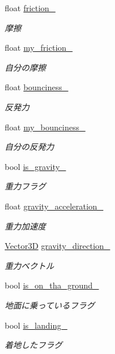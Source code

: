 \begin{DoxyCompactItemize}
float \mbox{\hyperlink{class_physics_a63b2e282267a28f0a160b98d56fa40b6}{friction\+\_\+}}
\begin{DoxyCompactList}\small\item\em 摩擦 \end{DoxyCompactList}\item 
float \mbox{\hyperlink{class_physics_a25f0db16668c86e90babbf9233b57511}{my\+\_\+friction\+\_\+}}
\begin{DoxyCompactList}\small\item\em 自分の摩擦 \end{DoxyCompactList}\item 
float \mbox{\hyperlink{class_physics_a302b8ad7552303570fa1cfd070bb8588}{bounciness\+\_\+}}
\begin{DoxyCompactList}\small\item\em 反発力 \end{DoxyCompactList}\item 
float \mbox{\hyperlink{class_physics_a6a04fea3f4790f2dfc2301940b8ccb6b}{my\+\_\+bounciness\+\_\+}}
\begin{DoxyCompactList}\small\item\em 自分の反発力 \end{DoxyCompactList}\item 
bool \mbox{\hyperlink{class_physics_ab49b5561a800bec8abcb3d35b1125c4e}{is\+\_\+gravity\+\_\+}}
\begin{DoxyCompactList}\small\item\em 重力フラグ \end{DoxyCompactList}\item 
float \mbox{\hyperlink{class_physics_af292ed854ca107f1a09a79931b10c3fa}{gravity\+\_\+acceleration\+\_\+}}
\begin{DoxyCompactList}\small\item\em 重力加速度 \end{DoxyCompactList}\item 
\mbox{\hyperlink{class_vector3_d}{Vector3D}} \mbox{\hyperlink{class_physics_aadfeac1807906f025d97143ba1c0f323}{gravity\+\_\+direction\+\_\+}}
\begin{DoxyCompactList}\small\item\em 重力ベクトル \end{DoxyCompactList}\item 
bool \mbox{\hyperlink{class_physics_a07a6416cab35698692378441c1750c4c}{is\+\_\+on\+\_\+tha\+\_\+ground\+\_\+}}
\begin{DoxyCompactList}\small\item\em 地面に乗っているフラグ \end{DoxyCompactList}\item 
bool \mbox{\hyperlink{class_physics_a863e16866ca69201a22365e480b7c74f}{is\+\_\+landing\+\_\+}}
\begin{DoxyCompactList}\small\item\em 着地したフラグ \end{DoxyCompactList}\end{DoxyCompactItemize}
